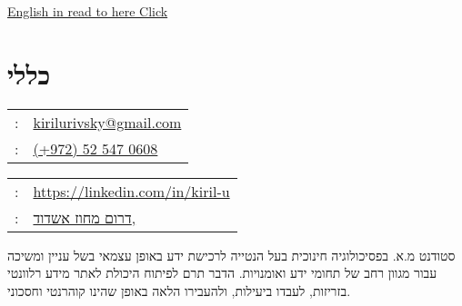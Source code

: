 \setRTL
\hspace{.25\textwidth}
\begin{minipage}[t]{.5\textwidth}
	\par{\par}
\end{minipage}

 \begin{minipage}[t]{1.0\textwidth}
	{\footnotesize\hfill{}\color{gray}
		\hfill{}\hyperref[sec:basicinfoeng]{English in read to here Click}	
	}
 \end{minipage}
\section{כללי}
\label{basicinfoheb}
\unsetRTL
\setLTR
\begin{minipage}[t]{.5\linewidth}
	\begin{tabular}{rp{.75\linewidth}}
		\baselineskip=20pt
		\email{} : &\href{mailto:kirilurivsky@gmail.com}{kirilurivsky@gmail.com}\\
		\phone{} : &\href{tel:972525470608}{(+972) 52 547 0608}
	\end{tabular}
\end{minipage}
\begin{minipage}[t]{.5\linewidth}
	\begin{tabular}{rl}
		\linkedin{} : &\href{https://www.linkedin.com/in/kiril-u}{https://linkedin.com/in/kiril-u}\\
		\location{} : &\href{https://goo.gl/maps/MSacjpSy7vZSKykP7}{דרום מחוז אשדוד,}
	\end{tabular}
\end{minipage}	
\unsetLTR
\unsetRTL
\setRTL
\begin{minipage}[t]{1\linewidth}
	\vspace{0.25cm} %
סטודנט מ.א. בפסיכולוגיה חינוכית בעל הנטייה לרכישת ידע באופן עצמאי בשל עניין ומשיכה עבור מגוון רחב של תחומי ידע ואומנויות. הדבר תרם לפיתוח היכולת לאתר מידע רלוונטי בזריזות, לעבדו ביעילות, ולהעבירו הלאה באופן שהינו קוהרנטי וחסכוני. 
\end{minipage}

%

